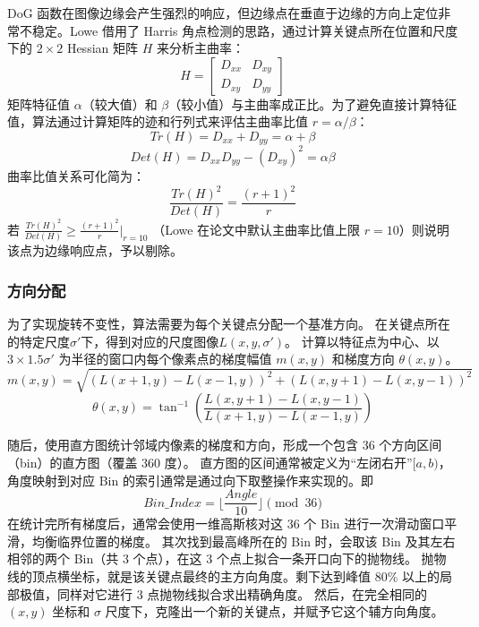 \documentclass[12pt,hyperref,a4paper,UTF8]{ctexart}
\begin{document}
DoG 函数在图像边缘会产生强烈的响应，但边缘点在垂直于边缘的方向上定位非常不稳定。Lowe 借用了 Harris 角点检测的思路\cite{Harris1988ACC}，通过计算关键点所在位置和尺度下的 $2 \times 2$ Hessian 矩阵 $H$ 来分析主曲率：
\begin{equation}
    H = \begin{bmatrix} D_{xx} & D_{xy} \\ D_{xy} & D_{yy} \end{bmatrix}
\end{equation}
矩阵特征值 $\alpha$（较大值）和 $\beta$（较小值）与主曲率成正比。为了避免直接计算特征值，算法通过计算矩阵的迹和行列式来评估主曲率比值 $r = \alpha / \beta$：
$$Tr(H) = D_{xx} + D_{yy} = \alpha + \beta$$
$$Det(H) = D_{xx}D_{yy} - (D_{xy})^2 = \alpha\beta$$
曲率比值关系可化简为：
\begin{equation}
    \frac{Tr(H)^2}{Det(H)} = \frac{(r+1)^2}{r}
\end{equation}
若 $\frac{Tr(H)^2}{Det(H)} \ge \frac{(r+1)^2}{r} \bigg |_{r=10}$
（Lowe 在论文中默认主曲率比值上限 $r=10$）则说明该点为边缘响应点，予以剔除。

\subsubsection{方向分配}

为了实现旋转不变性，算法需要为每个关键点分配一个基准方向。
在关键点所在的特定尺度$\sigma'$下，得到对应的尺度图像$L(x,y, \sigma')$。
计算以特征点为中心、以 $3 \times 1.5 \sigma'$ 为半径的窗口内每个像素点的梯度幅值 $m(x,y)$ 和梯度方向 $\theta(x,y)$。
\begin{equation}
    m(x,y) = \sqrt{(L(x+1,y) - L(x-1,y))^2 + (L(x,y+1) - L(x,y-1))^2}
\end{equation}
\begin{equation}
    \theta(x,y) = \tan^{-1}\left(\frac{L(x,y+1) - L(x,y-1)}{L(x+1,y) - L(x-1,y)}\right)
\end{equation}

随后，使用直方图统计邻域内像素的梯度和方向，形成一个包含 36 个方向区间（bin）的直方图（覆盖 360 度）。
直方图的区间通常被定义为“左闭右开”$[a, b)$，角度映射到对应 Bin 的索引通常是通过向下取整操作来实现的。即
$$
    Bin\_Index = \lfloor \frac{Angle}{10} \rfloor \pmod{36}
$$
在统计完所有梯度后，通常会使用一维高斯核对这 36 个 Bin 进行一次滑动窗口平滑，均衡临界位置的梯度。
其次找到最高峰所在的 Bin 时，会取该 Bin 及其左右相邻的两个 Bin（共 3 个点），在这 3 个点上拟合一条开口向下的抛物线。
抛物线的顶点横坐标，就是该关键点最终的主方向角度。剩下达到峰值 80\% 以上的局部极值，同样对它进行 3 点抛物线拟合求出精确角度。
然后，在完全相同的 $(x, y)$ 坐标和 $\sigma$ 尺度下，克隆出一个新的关键点，并赋予它这个辅方向角度。
\end{document}
